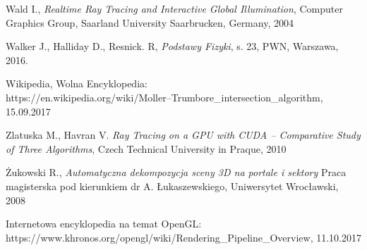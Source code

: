 \documentclass[eng,pl,printmode,openany]{mgr}
\begin{document}
\begin{thebibliography}{99}
	Wald I.,
	\emph{Realtime Ray Tracing and Interactive Global Illumination},
	Computer Graphics Group, Saarland University Saarbrucken, Germany,
	2004

	Walker J., Halliday D., Resnick. R,
	\emph{Podstawy Fizyki}, s. 23,
	PWN, Warszawa,
	2016.

	Wikipedia, Wolna Encyklopedia:\\ 
	https://en.wikipedia.org/wiki/Moller–Trumbore\_intersection\_algorithm, 15.09.2017
	
	Zlatuska M., Havran V. 
	\emph{Ray Tracing on a GPU with CUDA –
Comparative Study of Three Algorithms},
	Czech Technical University in Praque,
	2010
	
	Żukowski R.,
	\emph{Automatyczna dekompozycja sceny 3D na portale i sektory}
	Praca magisterska pod kierunkiem dr A. Łukaszewskiego,
	Uniwersytet Wrocławski,
	2008
	
	Internetowa encyklopedia na temat OpenGL: \\
	https://www.khronos.org/opengl/wiki/Rendering\_Pipeline\_Overview, 11.10.2017
	
\end{thebibliography}
\end{document}
